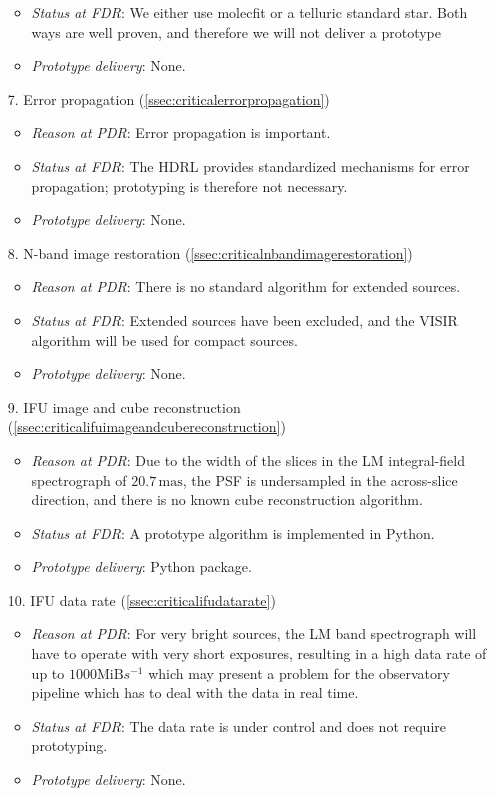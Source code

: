 \begin{enumerate}
\begin{itemize}
        \item \textit{Status at FDR}: We either use molecfit or a telluric standard star. Both ways are well proven, and therefore we will not deliver a prototype
        \item \textit{Prototype delivery}: None.
    \end{itemize}
    \item[7.] Error propagation (\ref{ssec:criticalerrorpropagation})
    \begin{itemize}
        \item \textit{Reason at PDR}: Error propagation is important.
        \item \textit{Status at FDR}: The \ac{HDRL} provides standardized mechanisms for error propagation; prototyping is therefore not necessary.
        \item \textit{Prototype delivery}: None.
    \end{itemize}
    \item[8.] N-band image restoration (\ref{ssec:criticalnbandimagerestoration})
    \begin{itemize}
        \item \textit{Reason at PDR}: There is no standard algorithm for extended sources.
        \item \textit{Status at FDR}: Extended sources have been excluded, and the VISIR algorithm will be used for compact sources.
        \item \textit{Prototype delivery}: None.
    \end{itemize}
    \item[9.] IFU image and cube reconstruction (\ref{ssec:criticalifuimageandcubereconstruction})
    \begin{itemize}
        \item \textit{Reason at PDR}: Due to the width of the slices in the LM integral-field spectrograph of $20.7\,\mathrm{mas}$,
            the PSF is undersampled in the across-slice direction, and there is no known cube reconstruction algorithm.
        \item \textit{Status at FDR}: A prototype algorithm is implemented in Python.
        \item \textit{Prototype delivery}: Python package.
    \end{itemize}
    \item[10.] IFU data rate (\ref{ssec:criticalifudatarate})
    \begin{itemize}
        \item \textit{Reason at PDR}: For very bright sources, the LM band spectrograph will have to operate with very short exposures,
            resulting in a high data rate of up to $1000 \mathrm{MiB}s^{-1}$ which may present a problem for
            the observatory pipeline which has to deal with the data in real time.
        \item \textit{Status at FDR}: The data rate is under control and does not require prototyping.
        \item \textit{Prototype delivery}: None.
    \end{itemize}
\end{enumerate}

